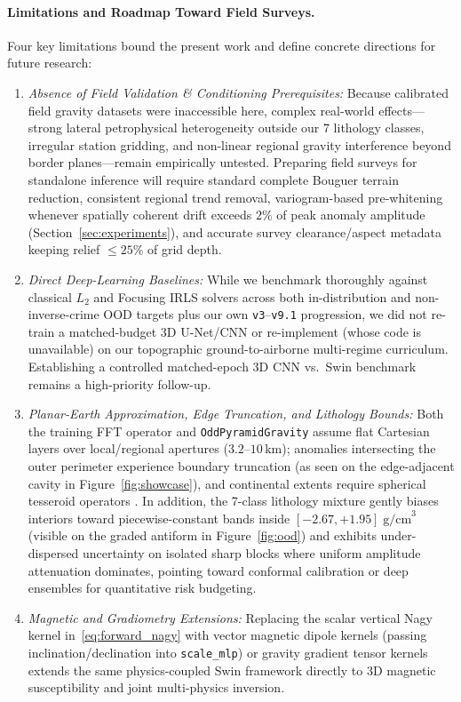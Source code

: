 \documentclass[11pt,a4paper]{article}
\begin{document}
\paragraph{Limitations and Roadmap Toward Field Surveys.}
Four key limitations bound the present work and define concrete directions for future research:
\begin{enumerate}[leftmargin=1.4em,itemsep=0.25em]
  \item \emph{Absence of Field Validation \& Conditioning Prerequisites:} Because calibrated field gravity datasets were inaccessible here, complex real-world effects---strong lateral petrophysical heterogeneity outside our 7 lithology classes, irregular station gridding, and non-linear regional gravity interference beyond border planes---remain empirically untested. Preparing field surveys for standalone inference will require standard complete Bouguer terrain reduction, consistent regional trend removal, variogram-based pre-whitening whenever spatially coherent drift exceeds $2\%$ of peak anomaly amplitude (Section~\ref{sec:experiments}), and accurate survey clearance/aspect metadata keeping relief $\le 25\%$ of grid depth.
  \item \emph{Direct Deep-Learning Baselines:} While we benchmark thoroughly against classical $L_2$ and Focusing IRLS solvers across both in-distribution and non-inverse-crime OOD targets plus our own \texttt{v3}--\texttt{v9.1} progression, we did not re-train a matched-budget 3D U-Net/CNN or re-implement \citet{yu2025swin} (whose code is unavailable) on our topographic ground-to-airborne multi-regime curriculum. Establishing a controlled matched-epoch 3D CNN vs.\ Swin benchmark remains a high-priority follow-up.
  \item \emph{Planar-Earth Approximation, Edge Truncation, and Lithology Bounds:} Both the training FFT operator and \texttt{OddPyramidGravity} assume flat Cartesian layers over local/regional apertures ($3.2\text{--}10$\,km); anomalies intersecting the outer perimeter experience boundary truncation (as seen on the edge-adjacent cavity in Figure~\ref{fig:showcase}), and continental extents require spherical tesseroid operators \citep{uieda2016}. In addition, the 7-class lithology mixture gently biases interiors toward piecewise-constant bands inside $[-2.67, +1.95]\;\text{g/cm}^3$ (visible on the graded antiform in Figure~\ref{fig:ood}) and exhibits under-dispersed uncertainty on isolated sharp blocks where uniform amplitude attenuation dominates, pointing toward conformal calibration or deep ensembles for quantitative risk budgeting.
  \item \emph{Magnetic and Gradiometry Extensions:} Replacing the scalar vertical Nagy kernel in~\eqref{eq:forward_nagy} with vector magnetic dipole kernels (passing inclination/declination into \texttt{scale\_mlp}) or gravity gradient tensor kernels extends the same physics-coupled Swin framework directly to 3D magnetic susceptibility and joint multi-physics inversion.
\end{enumerate}
\end{document}
